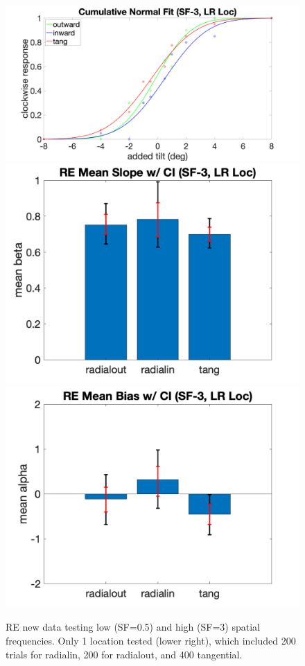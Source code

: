 \documentclass[11pt]{article} %
\begin{document}
\begin{figure}[H]
\includegraphics[scale=.06]{Images/PF_SF3.png}
\includegraphics[scale=.11]{Images/MeanSlopeError_SF3.png}
\includegraphics[scale=.11]{Images/MeanBiasError_SF3.png}
\caption{RE new data testing low (SF=0.5) and high (SF=3) spatial frequencies. Only 1 location tested (lower right), which included 200 trials for radialin, 200 for radialout, and 400 tangential.}
\end{figure}
\end{document}
